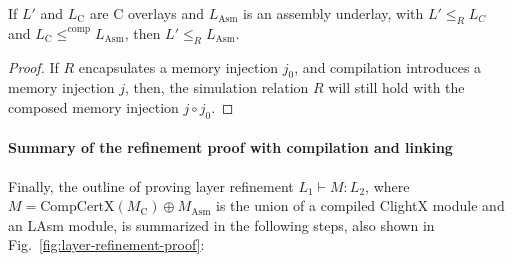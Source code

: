 \begin{lemma} \label{lem:sim-absorb-comp}
If $L'$ and $L_\text{C}$ are C overlays and $L_{\text{Asm}}$ is
an assembly underlay, with $L' \leqslant_R L_C$ and $L_\text{C} \leqslant^{\textrm{comp}} L_{\text{Asm}}$, then $L' \leqslant_R L_{\text{Asm}}$.
\end{lemma}
\begin{proof} 
If $R$ encapsulates a memory injection $j_0$, and compilation introduces a
memory injection $j$, then, the simulation relation $R$ will still hold with
the composed memory injection $j \circ j_0$.
\end{proof}

\paragraph{Summary of the refinement proof with compilation and linking}
Finally, the outline of proving layer refinement $L_1 \vdash M : L_2$,
where $M = \textrm{CompCertX}(M_\text{C}) \oplus M_\text{Asm}$ is the union
of a compiled ClightX module and an LAsm module,
is summarized in the following steps, also shown in
Fig.\ \ref{fig:layer-refinement-proof}:

